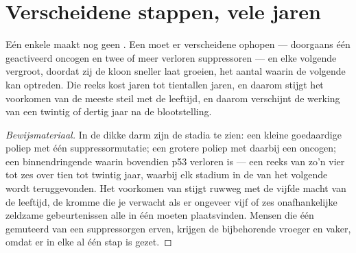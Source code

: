 \section{Verscheidene stappen, vele jaren}

\begin{proposition}\label{prop:g11:cancer:multistep}
Eén enkele  maakt nog geen . Een  moet er verscheidene
ophopen --- doorgaans één geactiveerd oncogen en twee of meer verloren
suppressoren --- en elke volgende  vergroot, doordat zij de kloon
sneller laat groeien, het aantal  waarin de volgende kan optreden.
Die reeks kost jaren tot tientallen jaren, en daarom stijgt het voorkomen
van de meeste  steil met de leeftijd, en daarom verschijnt de
werking van een  twintig of dertig jaar na de blootstelling.
\end{proposition}
\begin{proof}[Bewijsmateriaal]
In de dikke darm zijn de stadia te zien: een kleine goedaardige poliep met
één suppressormutatie; een grotere poliep met daarbij een oncogen; een
binnendringende  waarin bovendien p53 verloren is --- een reeks van
zo'n vier tot zes  over tien tot twintig jaar, waarbij elk stadium
in de  van het volgende wordt teruggevonden. Het voorkomen van
 stijgt ruwweg met de vijfde macht van de leeftijd, de kromme die je
verwacht als er ongeveer vijf of zes onafhankelijke zeldzame
gebeurtenissen alle in één  moeten plaatsvinden. Mensen die één
gemuteerd  van een suppressorgen erven, krijgen de bijbehorende
 vroeger en vaker, omdat er in elke  al één stap is gezet.
\end{proof}

